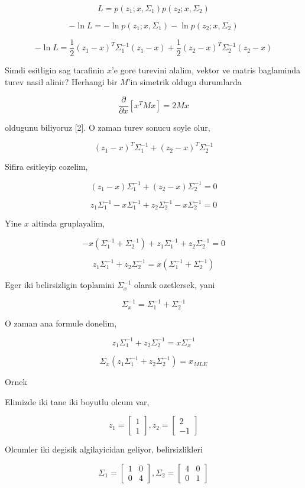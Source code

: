 \documentclass[12pt,fleqn]{article}\usepackage{../common}
\begin{document}
$$ L = p(z_1;x,\Sigma_1) p(z_2;x,\Sigma_2) 
$$

$$ -\ln L = -\ln p(z_1;x,\Sigma_1) -\ln p(z_2;x,\Sigma_2) 
$$

$$ -\ln L = 
\frac{ 1}{2}(z_1-x)^T\Sigma_1^{-1}(z_1-x) + 
\frac{ 1}{2}(z_2-x)^T\Sigma_2^{-1}(z_2-x)
$$

Simdi esitligin sag tarafinin $x$'e gore turevini alalim, vektor ve matris
baglaminda turev nasil alinir? Herhangi bir $M$'in simetrik oldugu
durumlarda

$$ \frac{\partial}{\partial x}[x^TMx] = 2Mx $$

oldugunu biliyoruz [2]. O zaman turev sonucu soyle olur, 

$$ 
(z_1-x)^T\Sigma_1^{-1} +  (z_2-x)^T\Sigma_2^{-1}
$$

Sifira esitleyip cozelim, 

$$ 
(z_1-x)\Sigma_1^{-1} +  (z_2-x)\Sigma_2^{-1} = 0
$$

$$ 
z_1\Sigma_1^{-1} - x\Sigma_1^{-1} + z_2\Sigma_2^{-1} - x\Sigma_2^{-1} = 0
$$

Yine $x$ altinda gruplayalim,

$$ 
-x(\Sigma_1^{-1} + \Sigma_2^{-1}) + z_1\Sigma_1^{-1}  + z_2\Sigma_2^{-1}  = 0
$$

$$ 
z_1\Sigma_1^{-1}  + z_2\Sigma_2^{-1}  = x(\Sigma_1^{-1} + \Sigma_2^{-1}) 
$$

Eger iki belirsizligin toplamini $\Sigma_x^{-1}$ olarak ozetlersek, yani 

$$ 
\Sigma_x^{-1} = \Sigma_1^{-1} + \Sigma_2^{-1}
$$

O zaman ana formule donelim,

$$ 
z_1\Sigma_1^{-1}  + z_2\Sigma_2^{-1}  = x\Sigma_x^{-1}
$$


$$ 
\Sigma_x (z_1\Sigma_1^{-1}  + z_2\Sigma_2^{-1}) = x_{MLE}
$$

Ornek

Elimizde iki tane iki boyutlu olcum var, 

$$ z_1 = \left[\begin{array}{c}
1 \\ 1
\end{array}\right], 
z_2 = \left[\begin{array}{r}
2 \\ -1
\end{array}\right] 
$$

Olcumler iki degisik algilayicidan geliyor, belirsizlikleri

$$ 
\Sigma_1 = 
\left[\begin{array}{cc}
1 & 0 \\ 0 & 4
\end{array}\right], 
\Sigma_2 = 
\left[\begin{array}{cc}
4 & 0 \\ 0 & 1
\end{array}\right]
 $$
\end{document}
